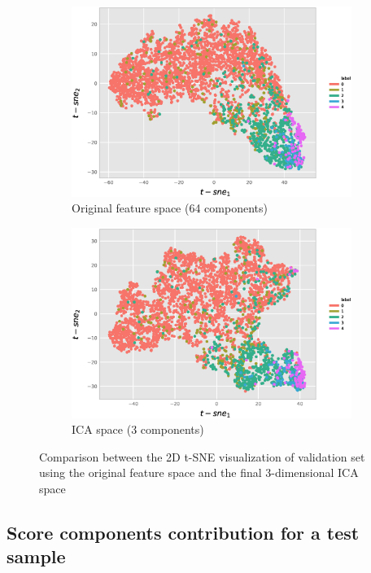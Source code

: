 \documentclass[preprint]{elsarticle}
\theoremstyle{definition} %
\theoremstyle{remark}
\begin{document}
\begin{figure}[h]
	\centering
	\begin{subfigure}[b]{0.49\textwidth}
		\centering
		\includegraphics[width=\textwidth]{figures/tsne2d_p75.eps}
		\caption{Original feature space (64 components)}	
	\end{subfigure}
	\begin{subfigure}[b]{0.49\textwidth}
		\centering
		\includegraphics[width=\textwidth]{figures/tsne2d_ica_p75.eps}
		\caption{ICA space (3 components)}
	\end{subfigure}
	
	\caption{Comparison between the 2D t-SNE visualization of validation set using the original feature space and the final 3-dimensional ICA space}  
	\label{fig:tsne} 
\end{figure}

\subsection{Score components contribution for a test sample}
\end{document}
